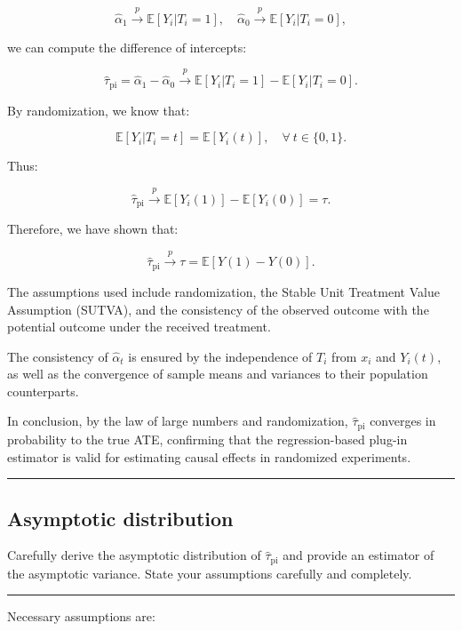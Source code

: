\documentclass{article}
\newenvironment{colorparagraph}[1]{\par\color{#1}}{\par}
\begin{document}
\[
\hat{\alpha}_1 \xrightarrow{p} \mathbb{E}[Y_i | T_i = 1], \quad \hat{\alpha}_0 \xrightarrow{p} \mathbb{E}[Y_i | T_i = 0],
\]

we can compute the difference of intercepts:

\[
\hat{\tau}_{\text{pi}} = \hat{\alpha}_1 - \hat{\alpha}_0 \xrightarrow{p} \mathbb{E}[Y_i | T_i = 1] - \mathbb{E}[Y_i | T_i = 0].
\]

By randomization, we know that:

\[
\mathbb{E}[Y_i | T_i = t] = \mathbb{E}[Y_i(t)], \quad \forall \ t \in \{0, 1\}.
\]

Thus:

\[
\hat{\tau}_{\text{pi}} \xrightarrow{p} \mathbb{E}[Y_i(1)] - \mathbb{E}[Y_i(0)] = \tau.
\]

Therefore, we have shown that:

\[
\hat{\tau}_{\text{pi}} \xrightarrow{p} \tau = \mathbb{E}[Y(1) - Y(0)].
\]

The assumptions used include randomization, the Stable Unit Treatment Value Assumption (SUTVA), and the consistency of the observed outcome with the potential outcome under the received treatment.

The consistency of \(\hat{\alpha}_t\) is ensured by the independence of \(T_i\) from \(x_i\) and \(Y_i(t)\), as well as the convergence of sample means and variances to their population counterparts.

In conclusion, by the law of large numbers and randomization, \(\hat{\tau}_{\text{pi}}\) converges in probability to the true ATE, confirming that the regression-based plug-in estimator is valid for estimating causal effects in randomized experiments.

\begin{colorparagraph}{questioncolor}
\rule{\textwidth}{0.5pt}  

\label{q2k}\subsection{Asymptotic distribution}
Carefully derive the asymptotic distribution of \(\hat{\tau}_{\text{pi}}\) and provide an estimator of the asymptotic variance. State your assumptions carefully and completely.

\rule{\textwidth}{0.5pt}
\end{colorparagraph}

Necessary assumptions are:
\end{document}
